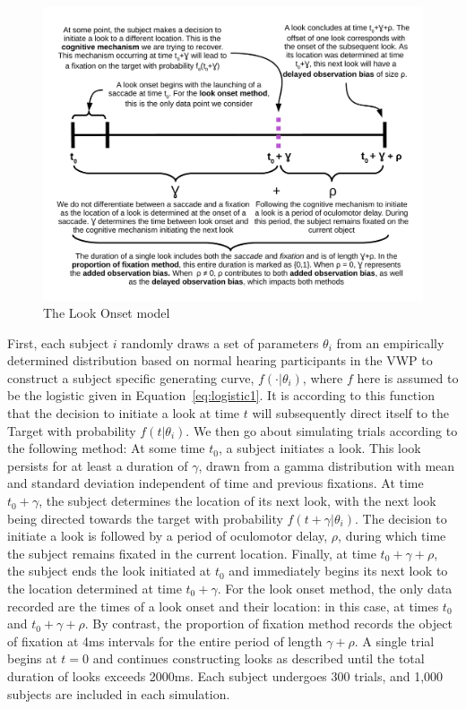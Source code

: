 \documentclass{article}
\begin{document}
\begin{figure}[H]
\centering
\includegraphics[width=\textwidth]{anatomy_of_look.pdf}
\caption{The Look Onset model}
\label{fig:anatomy_of_look}
\end{figure}


First, each subject $i$ randomly draws a set of parameters $\theta_i$ from an empirically determined distribution based on normal hearing participants in the VWP \citep{FarrisTrimble2014} to construct a subject specific generating curve, $f(\cdot | \theta_i)$, where $f$ here is assumed to be the logistic given in Equation~\ref{eq:logistic1}.  It is according to this function that the decision to initiate a look at time $t$ will subsequently direct itself to the Target with probability $f(t|\theta_i)$. We then go about simulating trials according to the following method: At some time $t_0$, a subject initiates a look. This look persists for at least a duration of $\gamma$, drawn from a gamma distribution with mean and standard deviation independent of time and previous fixations. At time $t_0+\gamma$, the subject determines the location of its next look, with the next look being directed towards the target with probability $f(t+\gamma | \theta_i)$. The decision to initiate a look is followed by a period of oculomotor delay, $\rho$, during which time the subject remains fixated in the current location. Finally, at time $t_0 + \gamma + \rho$, the subject ends the look initiated at $t_0$ and immediately begins its next look to the location determined at time $t_0 + \gamma$. For the look onset method, the only data recorded are the times of a look onset and their location: in this case, at times $t_0$ and $t_0 + \gamma + \rho$. By contrast, the proportion of fixation method records the object of fixation at 4ms intervals for the entire period of length $\gamma + \rho$. A single trial begins at $t = 0$ and continues constructing looks as described until the total duration of looks exceeds 2000ms. Each subject undergoes 300 trials, and 1,000 subjects are included in each simulation.
\end{document}
